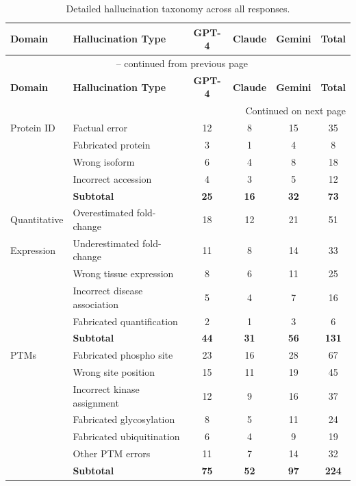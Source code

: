 \documentclass[11pt,a4paper]{article}
\begin{document}
\begin{longtable}{llcccc}
\caption{Detailed hallucination taxonomy across all responses.} \label{tab:taxonomy} \\
\toprule
\textbf{Domain} & \textbf{Hallucination Type} & \textbf{GPT-4} & \textbf{Claude} & \textbf{Gemini} & \textbf{Total} \\
\midrule
\endfirsthead
\multicolumn{6}{c}{{\tablename\ \thetable{} -- continued from previous page}} \\
\toprule
\textbf{Domain} & \textbf{Hallucination Type} & \textbf{GPT-4} & \textbf{Claude} & \textbf{Gemini} & \textbf{Total} \\
\midrule
\endhead
\midrule
\multicolumn{6}{r}{{Continued on next page}} \\
\endfoot
\bottomrule
\endlastfoot

Protein ID & Factual error & 12 & 8 & 15 & 35 \\
& Fabricated protein & 3 & 1 & 4 & 8 \\
& Wrong isoform & 6 & 4 & 8 & 18 \\
& Incorrect accession & 4 & 3 & 5 & 12 \\
& \textbf{Subtotal} & \textbf{25} & \textbf{16} & \textbf{32} & \textbf{73} \\
\midrule

Quantitative & Overestimated fold-change & 18 & 12 & 21 & 51 \\
Expression & Underestimated fold-change & 11 & 8 & 14 & 33 \\
& Wrong tissue expression & 8 & 6 & 11 & 25 \\
& Incorrect disease association & 5 & 4 & 7 & 16 \\
& Fabricated quantification & 2 & 1 & 3 & 6 \\
& \textbf{Subtotal} & \textbf{44} & \textbf{31} & \textbf{56} & \textbf{131} \\
\midrule

PTMs & Fabricated phospho site & 23 & 16 & 28 & 67 \\
& Wrong site position & 15 & 11 & 19 & 45 \\
& Incorrect kinase assignment & 12 & 9 & 16 & 37 \\
& Fabricated glycosylation & 8 & 5 & 11 & 24 \\
& Fabricated ubiquitination & 6 & 4 & 9 & 19 \\
& Other PTM errors & 11 & 7 & 14 & 32 \\
& \textbf{Subtotal} & \textbf{75} & \textbf{52} & \textbf{97} & \textbf{224} \\
\midrule


\end{longtable}
\end{document}
